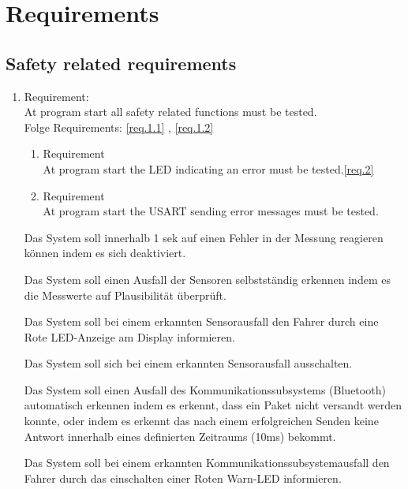 \section{Requirements}
\label{chapter6}


\subsection{Safety related requirements}




 \begin{enumerate}[label*=\arabic*.]
 	\item \label{req.1}  Requirement: \\
	 	At program start all safety related functions must be tested.  \\
	 	Folge Requirements: \ref{req.1.1} , \ref{req.1.2}  
	 	\begin{enumerate}[label*=\arabic*.]
	 		\item \label{req.1.1}  Requirement  \\
	 		At program start the LED indicating an error must be tested.\ref{req.2}\\ 
	 		\item \label{req.1.2} Requirement   \\
	 		At program start the USART sending error messages must be tested.\\ 
	 	\end{enumerate}

Das System soll innerhalb 1 sek auf einen Fehler in der Messung reagieren können indem es sich deaktiviert.

Das System soll einen Ausfall der Sensoren selbstständig erkennen indem es die Messwerte auf Plausibilität überprüft.

Das System soll bei einem erkannten Sensorausfall den Fahrer durch eine Rote LED-Anzeige am Display informieren.

Das System soll sich bei einem erkannten Sensorausfall ausschalten.

Das System soll einen Ausfall des Kommunikationssubsystems (Bluetooth) automatisch erkennen indem es erkennt, dass ein Paket nicht versandt werden konnte, oder indem es erkennt das nach einem erfolgreichen Senden keine Antwort innerhalb eines definierten Zeitraums (10ms) bekommt.

Das System soll bei einem erkannten Kommunikationssubsystemausfall den Fahrer durch das einschalten einer Roten Warn-LED informieren.


\end{enumerate}
